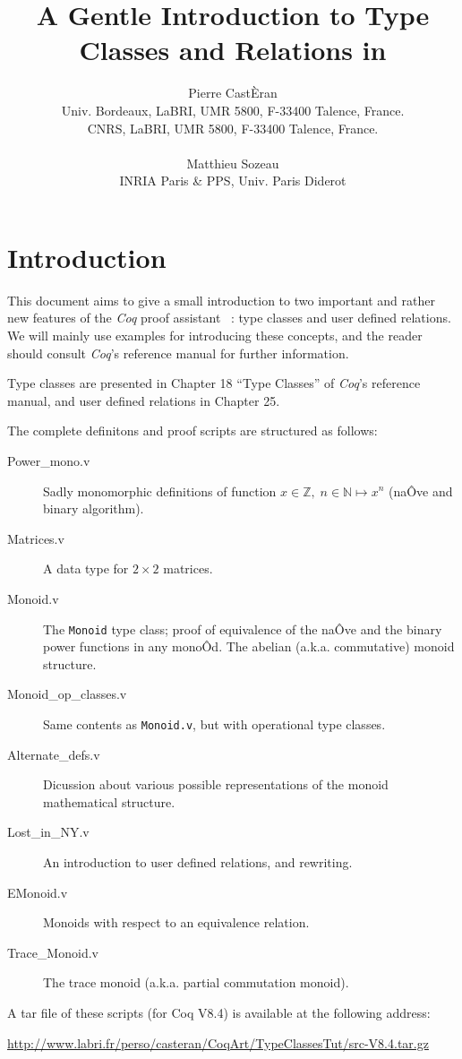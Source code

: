 \documentclass[a4]{report}
\title{A Gentle Introduction to Type Classes and Relations in \coq{}}
\author{Pierre CastÈran\\Univ. Bordeaux, LaBRI, UMR 5800, F-33400 Talence, France.\\
CNRS, LaBRI, UMR 5800, F-33400 Talence, France.\\
\\
Matthieu Sozeau\\INRIA Paris \& PPS, Univ. Paris Diderot}
\newcommand{\coq}{\mbox{\emph{Coq}}}
\begin{document}
\maketitle

\chapter{Introduction}

This document aims to give a small introduction to two important and
rather new features of the {\coq} proof assistant~\citep{Coq, coqart} : type classes and user defined
relations. We will mainly use examples for introducing these concepts, and 
the reader should consult \coq's reference manual for further information.

Type classes are presented in Chapter 18 ``Type Classes''  of {\coq}'s reference manual, and user defined relations in Chapter 25.

The complete definitons and proof scripts are structured as follows:
\begin{description}
\item[Power\_mono.v] Sadly monomorphic definitions of function
   $x\in \mathbb{Z},\;n\in\mathbb{N}\mapsto x^n$ (naÔve and binary algorithm).
\item[Matrices.v] A data type for $2\times 2$ matrices.
\item[Monoid.v] The \texttt{Monoid} type class; proof of equivalence of
  the naÔve and the binary power functions in any monoÔd. The abelian
  (a.k.a. commutative) monoid structure.
\item[Monoid\_op\_classes.v]
  Same contents as \texttt{Monoid.v}, but with operational type classes.
\item[Alternate\_defs.v] Dicussion about various possible representations of
        the monoid mathematical structure.
\item[Lost\_in\_NY.v] An introduction to user defined relations, and rewriting.
\item[EMonoid.v]  Monoids with respect to an equivalence relation.
\item[Trace\_Monoid.v] The trace monoid (a.k.a. partial commutation monoid).
\end{description}

A tar file of these scripts (for Coq V8.4) is available 
at the following address:

\href{http://www.labri.fr/perso/casteran/CoqArt/TypeClassesTut/src-V8.4.tar.gz}{http://www.labri.fr/perso/casteran/CoqArt/TypeClassesTut/src-V8.4.tar.gz}
\end{document}
